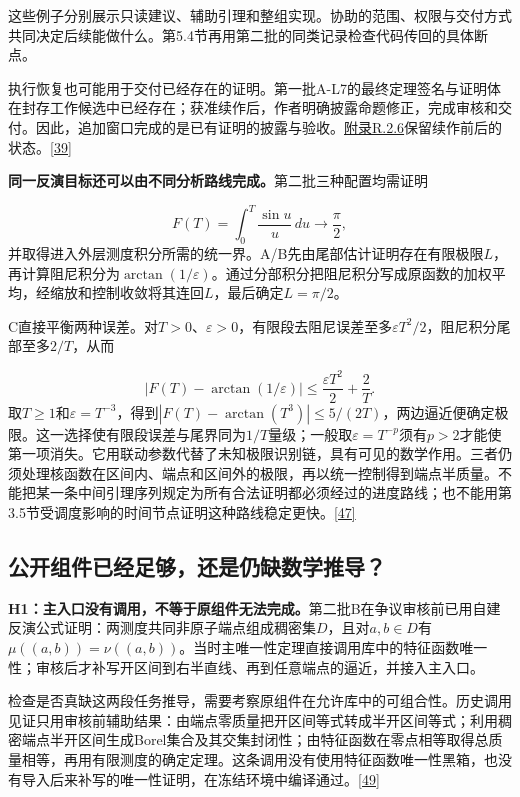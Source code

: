 这些例子分别展示只读建议、辅助引理和整组实现。协助的范围、权限与交付方式共同决定后续能做什么。第5.4节再用第二批的同类记录检查代码传回的具体断点。

执行恢复也可能用于交付已经存在的证明。第一批A-L7的最终定理签名与证明体在封存工作候选中已经存在；获准续作后，作者明确披露命题修正，完成审核和交付。因此，追加窗口完成的是已有证明的披露与验收。\href{zh-appendix.pdf\#r2-6}{附录R.2.6}保留续作前后的状态。\hyperlink{ref-39}{\mbox{[39]}}

\textbf{同一反演目标还可以由不同分析路线完成。}第二批三种配置均需证明

\[
F(T)=\int_0^T\frac{\sin u}{u}\,du\longrightarrow\frac\pi2,
\]
并取得进入外层测度积分所需的统一界。A/B先由尾部估计证明存在有限极限$L$，再计算阻尼积分为$\arctan(1/\varepsilon)$。通过分部积分把阻尼积分写成原函数的加权平均，经缩放和控制收敛将其连回$L$，最后确定$L=\pi/2$。

C直接平衡两种误差。对$T>0$、$\varepsilon>0$，有限段去阻尼误差至多$\varepsilon T^2/2$，阻尼积分尾部至多$2/T$，从而

\[
|F(T)-\arctan(1/\varepsilon)|\leq\frac{\varepsilon T^2}{2}+\frac2T.
\]
取$T\ge1$和$\varepsilon=T^{-3}$，得到$|F(T)-\arctan(T^3)|\le5/(2T)$，两边逼近便确定极限。这一选择使有限段误差与尾界同为$1/T$量级；一般取$\varepsilon=T^{-p}$须有$p>2$才能使第一项消失。它用联动参数代替了未知极限识别链，具有可见的数学作用。三者仍须处理核函数在区间内、端点和区间外的极限，再以统一控制得到端点半质量。不能把某一条中间引理序列规定为所有合法证明都必须经过的进度路线；也不能用第3.5节受调度影响的时间节点证明这种路线稳定更快。\hyperlink{ref-47}{\mbox{[47]}}

\subsection[公开组件已经足够，还是仍缺数学推导？]{\texorpdfstring{\protect\hypertarget{section-4-4}{}公开组件已经足够，还是仍缺数学推导？}{公开组件已经足够，还是仍缺数学推导？}}
\textbf{H1：主入口没有调用，不等于原组件无法完成。}第二批B在争议审核前已用自建反演公式证明：两测度共同非原子端点组成稠密集$D$，且对$a,b\in D$有$\mu((a,b))=\nu((a,b))$。当时主唯一性定理直接调用库中的特征函数唯一性；审核后才补写开区间到右半直线、再到任意端点的逼近，并接入主入口。

检查是否真缺这两段任务推导，需要考察原组件在允许库中的可组合性。历史调用见证只用审核前辅助结果：由端点零质量把开区间等式转成半开区间等式；利用稠密端点半开区间生成Borel集合及其交集封闭性；由特征函数在零点相等取得总质量相等，再用有限测度的确定定理。这条调用没有使用特征函数唯一性黑箱，也没有导入后来补写的唯一性证明，在冻结环境中编译通过。\hyperlink{ref-49}{\mbox{[49]}}

